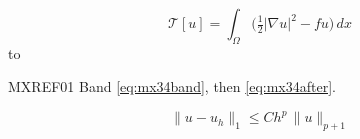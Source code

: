 \documentclass[twocolumn]{article}
\begin{document}
\begin{wideband}
\begin{equation}\label{eq:mx34band}
  \mathcal{T}[u] = \int_{\Omega}\bigl(\tfrac12|\nabla u|^2 - fu\bigr)\,dx
\end{equation}
\noindent\hbox to
\end{wideband}
\noindent\mbox{MXREF01} Band \eqref{eq:mx34band}, then \eqref{eq:mx34after}.\par
\begin{equation}\label{eq:mx34after}
  \|u - u_h\|_{1} \le C h^{p}\,\|u\|_{p+1}
\end{equation}
\end{document}
